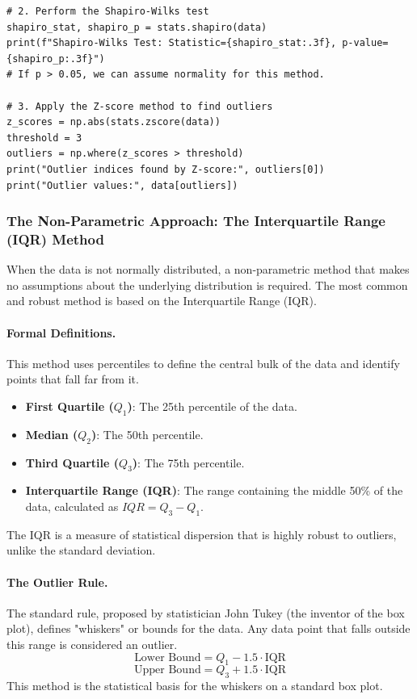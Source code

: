 \begin{itemize}
\begin{verbatim}
# 2. Perform the Shapiro-Wilks test
shapiro_stat, shapiro_p = stats.shapiro(data)
print(f"Shapiro-Wilks Test: Statistic={shapiro_stat:.3f}, p-value={shapiro_p:.3f}")
# If p > 0.05, we can assume normality for this method.

# 3. Apply the Z-score method to find outliers
z_scores = np.abs(stats.zscore(data))
threshold = 3
outliers = np.where(z_scores > threshold)
print("Outlier indices found by Z-score:", outliers[0])
print("Outlier values:", data[outliers])
\end{verbatim}

\subsubsection{The Non-Parametric Approach: The Interquartile Range (IQR) Method}
When the data is not normally distributed, a non-parametric method that makes no assumptions about the underlying distribution is required. The most common and robust method is based on the Interquartile Range (IQR).

\paragraph{Formal Definitions.} This method uses percentiles to define the central bulk of the data and identify points that fall far from it.
\begin{itemize}
    \item \textbf{First Quartile ($Q_1$)}: The 25th percentile of the data.
    \item \textbf{Median ($Q_2$)}: The 50th percentile.
    \item \textbf{Third Quartile ($Q_3$)}: The 75th percentile.
    \item \textbf{Interquartile Range (IQR)}: The range containing the middle 50\% of the data, calculated as $IQR = Q_3 - Q_1$.
\end{itemize}
The IQR is a measure of statistical dispersion that is highly robust to outliers, unlike the standard deviation.

\paragraph{The Outlier Rule.} The standard rule, proposed by statistician John Tukey (the inventor of the box plot), defines "whiskers" or bounds for the data. Any data point that falls outside this range is considered an outlier.
$$ \text{Lower Bound} = Q_1 - 1.5 \cdot \text{IQR} $$
$$ \text{Upper Bound} = Q_3 + 1.5 \cdot \text{IQR} $$
This method is the statistical basis for the whiskers on a standard box plot.


\end{itemize}
